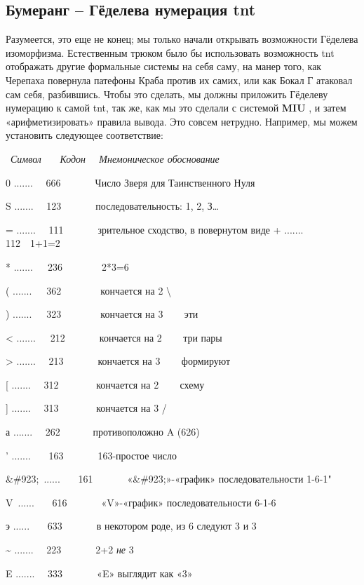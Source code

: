 \documentclass[../main.tex]{subfiles}
\begin{document}
\subsection{Бумеранг \--- Гёделева нумерация \acs{tnt}}

Разумеется, это еще не конец; мы только начали открывать возможности Гёделева изоморфизма. Естественным трюком было бы использовать возможность \acs{tnt} отображать другие формальные системы на себя саму, на манер того, как Черепаха повернула патефоны Краба против их самих, или как Бокал Г атаковал сам себя, разбившись. Чтобы это сделать, мы должны приложить Гёделеву нумерацию к самой \acs{tnt}, так же, как мы это сделали с системой \textbf{MIU} , и затем «арифметизировать» правила вывода. Это совсем нетрудно. Например, мы можем установить следующее соответствие:

~\emph{Символ~~~ Кодон~~ Мнемоническое обоснование}

0 .......~~ 666~~~~~~~Число Зверя для Таинственного Нуля

S .......~~ 123~~~~~~~последовательность: 1, 2, З\ldots{}

= .......~~ 111~~~~~~~зрительное сходство, в повернутом виде + ....... 112~~1+1=2

* .......~~~236~~~~~~~~2*3=6

( .......~~~362~~~~~~~~кончается на 2 \textbackslash{}

) .......~~~323~~~~~~~~кончается на 3~ \textbar~~ эти

\textless{} .......~~~212~~~~~~~кончается на 2~ \textbar~~ три пары

\textgreater{} .......~~ 213~~~~~~~кончается на 3~ \textbar~~ формируют

{[} .......~~ 312~~~~~~~ кончается на 2~ \textbar~~ схему

{]} .......~~ 313~~~~~~~ кончается на 3 /

а .......~~ 262~~~~~~ противоположно A (626)

' .......~~~ 163~~~~~~~163-простое число

\&\#923;~......~~~ 161~~~~~~~«\&\#923;»-«график» последовательности 1-6-1"

V~......~~~ 616~~~~~~~«V»-«график» последовательности 6-1-6

э ......~~~ 633~~~~~~~в некотором роде, из 6 следуют 3 и 3

\textasciitilde{} .......~~ 223~~~~~~~2+2 \emph{не} 3

E .......~~ 333~~~~~~~«E» выглядит как «3»
\end{document}
